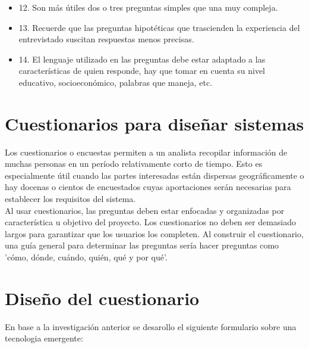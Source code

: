 \documentclass[11pt]{article}
\begin{document}
\begin{itemize}
\item 12. Son más útiles dos o tres preguntas simples que una muy compleja.

\item 13. Recuerde que las preguntas hipotéticas que trascienden la
experiencia del entrevistado suscitan respuestas menos precisas.

\item 14. El lenguaje utilizado en las preguntas debe estar adaptado a las
características de quien responde, hay que tomar en cuenta su nivel
educativo, socioeconómico, palabras que maneja, etc.
\end{itemize}

\section{Cuestionarios para diseñar sistemas}
\label{sec:org5f9125b}
\autocite{Eid_2015} Los cuestionarios o encuestas permiten a un
analista recopilar información de muchas personas en un período
relativamente corto de tiempo. Esto es especialmente útil cuando las
partes interesadas están dispersas geográficamente o hay docenas o
cientos de encuestados cuyas aportaciones serán necesarias para
establecer los requisitos del sistema. \\

\autocite{Eid_2015} Al usar cuestionarios, las preguntas deben
estar enfocadas y organizadas por característica u objetivo del
proyecto. Los cuestionarios no deben ser demasiado largos para
garantizar que los usuarios los completen. Al construir el
cuestionario, una guía general para determinar las preguntas sería
hacer preguntas como 'cómo, dónde, cuándo, quién, qué y por qué'.

\section{Diseño del cuestionario}
\label{sec:orgdf04fe0}
En base a la investigación anterior se desarollo el siguiente formulario sobre
una tecnologia emergente: 
\end{document}
